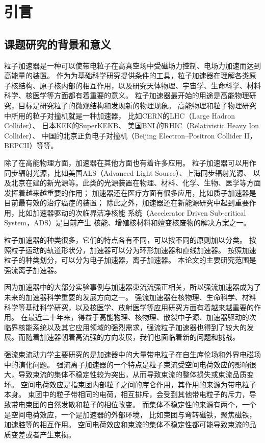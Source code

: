 
\chapter{引言}
\label{chap:Introduction}

\section{课题研究的背景和意义}
\label{section:background}
粒子加速器是一种可以使带电粒子在高真空场中受磁场力控制、电场力加速而达到高能量的装置。
作为为基础科学研究提供条件的工具，粒子加速器在理解各类原子核结构、原子核内部的相互作用，以及研究天体物理、宇宙学、生命科学、材料科学、核医学等方面都有着重要的意义。
粒子加速器最开始的用途是高能物理研究，目标是研究粒子的微观结构和发现新的物理现象。
高能物理和粒子物理研究中所用的粒子对撞机就是一种加速器，
比如CERN的LHC（Large Hadron Collider）、
日本KEK的SuperKEKB、
美国BNL的RHIC（Relativistic Heavy Ion Collider）、
中国的北京正负电子对撞机（Beijing Electron–Positron Collider II，BEPCII）等等。

除了在高能物理方面，加速器在其他方面也有着许多应用。
粒子加速器可以用作同步辐射光源，比如美国ALS（Advanced Light Source）、上海同步辐射光源、
以及北京在建的新光源等。此类的光源装置在物理、材料、化学、生物、医学等方面发挥着越来越重要的作用；
加速器还在医疗方面有很多应用，比如质子加速器是目前最有效的治疗癌症的装置；
除此之外，加速器还在新能源研究中起到重要作用，比如加速器驱动的次临界洁净核能
系统（Accelerator Driven Sub-critical System，ADS）是目前产生
核能、增殖核材料和嬗变核废物的解决方案之一。

粒子加速器的种类很多，它们的特点各有不同，可以按不同的原则加以分类。
按照粒子运动的轨道形状分，加速器可以分为环形加速器和直线加速器。
按照加速粒子的种类划分，可以分为电子加速器，离子加速器。
本论文的主要研究范围是强流离子加速器。

因为加速器中的大部分实验事例与加速器束流流强正相关，所以强流加速器成为了未来的加速器科学重要的发展方向之一。
强流加速器在核物理、生命科学、材料科学等基础科学研究，以及核医学、放射医学等应用研究方面有着越来越重要的作用。
在最近二十年来，得益于高能物理、核物理、散裂中子源、加速器驱动的次临界核能系统以及其它应用领域的强烈需求，强流粒子加速器也得到了较大的发展\cite{wei2003synchrotrons,chou2002synchrotron}。而随着加速器朝着高流强的方向发展，我们也面临着新的问题和挑战。

强流束流动力学主要研究的是加速器中的大量带电粒子在自生库伦场和外界电磁场中的演化问题。
强流离子加速器的一个特点是粒子束流受空间电荷效应的影响很大，导致束流的集体不稳定性较为突出，从而导致束流的整体损失或束流品质变坏。
空间电荷效应是指束团内部粒子之间的库仑作用，其作用的来源为带电粒子本身。
束团中的粒子带相同的电荷，相互排斥，会受到其他带电粒子的斥力，导致带电束团的自然发散和粒子的相位改变。
而集体不稳定性的来源有两个，一个是空间电荷效应，一个是加速器的外部环境，
比如束团与弯转磁铁，聚焦磁铁，加速腔等的相互作用。
空间电荷效应和束流的集体不稳定性都可能导致束流的品质变差或者产生束损。

